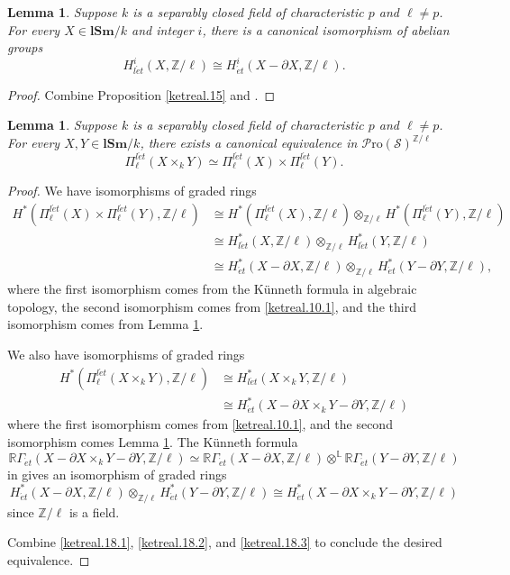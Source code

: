 \documentclass[11pt, a4paper]{amsart}
\newtheorem{lem}[thm]{Lemma}
\theoremstyle{definition}
\numberwithin{equation}{subsection}
\newcommand{\Z}{\mathbb{Z}}
\newcommand{\R}{\mathbb{R}}
\newcommand{\bbL}{\mathbb{L}}
\newcommand{\lSm}{\mathbf{lSm}}
\newcommand{\et}{{\acute{e}t}}
\newcommand{\leta}{{l\acute{e}t}}
\newcommand{\infSpc}{\mathcal{S}}
\newcommand{\infPro}{\mathcal{P}\mathrm{ro}}
\begin{document}
\begin{lem}
\label{ketreal.19}
Suppose $k$ is a separably closed field of characteristic $p$ and $\ell\neq p$.
For every $X\in \lSm/k$ and integer $i$, there is a canonical isomorphism of abelian groups
\[
H_{\leta}^i(X,\Z/\ell)
\cong
H_{\et}^i(X-\partial X,\Z/\ell).
\]
\end{lem}
\begin{proof}
Combine Proposition \ref{ketreal.15} and \cite[Corollary 7.5]{MR1922832}.
\end{proof}

\begin{lem}
\label{ketreal.18}
Suppose $k$ is a separably closed field of characteristic $p$ and $\ell\neq p$.
For every $X,Y\in \lSm/k$, there exists a canonical
equivalence in $\infPro(\infSpc)^{\Z/\ell}$
\[
\Pi_{\ell}^{\leta}(X\times_k Y)
\simeq
\Pi_{\ell}^{\leta}(X)
\times
\Pi_{\ell}^{\leta}(Y).
\]
\end{lem}
\begin{proof}
We have isomorphisms of graded rings
\begin{equation}
\label{ketreal.18.1}
\begin{split}
H^*(\Pi_{\ell}^{\leta}(X)\times \Pi_\ell^{\leta}(Y),\Z/\ell)
&\cong
H^*(\Pi_{\ell}^{\leta}(X),\Z/\ell)
\otimes_{\Z/\ell}
H^*(\Pi_{\ell}^{\leta}(Y),\Z/\ell)
\\
&\cong
H_{\leta}^*(X,\Z/\ell)
\otimes_{\Z/\ell}
H_{\leta}^*(Y,\Z/\ell)
\\
&\cong
H_{\et}^*(X-\partial X,\Z/\ell)
\otimes_{\Z/\ell}
H_{\et}^*(Y-\partial Y,\Z/\ell),
\end{split}
\end{equation}
where the first isomorphism comes from the K\"unneth formula in algebraic topology, the second isomorphism comes from \eqref{ketreal.10.1}, and the third isomorphism comes from Lemma \ref{ketreal.19}.

We also have isomorphisms of graded rings
\begin{equation}
\label{ketreal.18.2}
\begin{split}
H^*(\Pi_{\ell}^{\leta}(X\times_k Y),\Z/\ell)
&\cong
H_{\leta}^*(X\times_k Y,\Z/\ell)
\\
&\cong
H_{\et}^*(X-\partial X\times_k Y-\partial Y,\Z/\ell)
\end{split}
\end{equation}
where the first isomorphism comes from \eqref{ketreal.10.1}, and the second isomorphism comes Lemma \ref{ketreal.19}.
The K\"unneth formula
\[
\R\Gamma_{\et}(X-\partial X\times_k Y-\partial Y,\Z/\ell)
\simeq
\R\Gamma_{\et}(X-\partial X,\Z/\ell)
\otimes^{\bbL}
\R\Gamma_{\et}(Y-\partial Y,\Z/\ell)
\]
in \cite[{Th.\ finitude, Corollaire 1.11}]{SGA4half} gives an isomorphism of graded rings
\begin{equation}
\label{ketreal.18.3}
H_{\et}^*(X-\partial X,\Z/\ell)
\otimes_{\Z/\ell}
H_{\et}^*(Y-\partial Y,\Z/\ell)
\cong H_{\et}^*(X-\partial X\times_k Y-\partial Y,\Z/\ell)
\end{equation}
since $\Z/\ell$ is a field.

Combine \eqref{ketreal.18.1}, \eqref{ketreal.18.2}, and \eqref{ketreal.18.3} to conclude the desired equivalence.
\end{proof}
\end{document}
